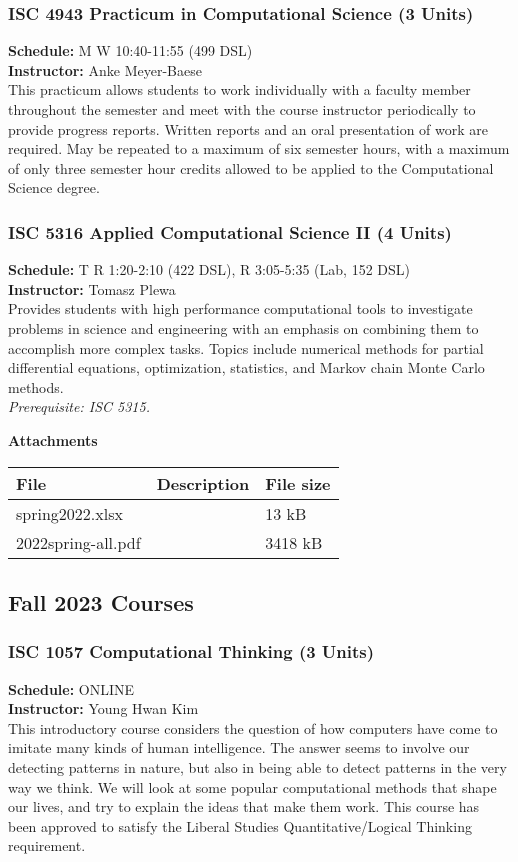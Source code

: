 \documentclass[12pt,a4paper]{article}
\begin{document}
\subsubsection*{ISC 4943 Practicum in Computational Science (3 Units)}
\textbf{Schedule:} M W 10:40-11:55 (499 DSL) \\
\textbf{Instructor:} Anke Meyer-Baese \\
This practicum allows students to work individually with a faculty member throughout the semester and meet with the course instructor periodically to provide progress reports. Written reports and an oral presentation of work are required. May be repeated to a maximum of six semester hours, with a maximum of only three semester hour credits allowed to be applied to the Computational Science degree.

\subsubsection*{ISC 5316 Applied Computational Science II (4 Units)}
\textbf{Schedule:} T R 1:20-2:10 (422 DSL), R 3:05-5:35 (Lab, 152 DSL) \\
\textbf{Instructor:} Tomasz Plewa \\
Provides students with high performance computational tools to investigate problems in science and engineering with an emphasis on combining them to accomplish more complex tasks. Topics include numerical methods for partial differential equations, optimization, statistics, and Markov chain Monte Carlo methods. \\
\textit{Prerequisite: ISC 5315.}

\begin{center}
\textbf{Attachments}
\begin{tabular}{l l l}
\hline
\textbf{File} & \textbf{Description} & \textbf{File size} \\ \hline
spring2022.xlsx & & 13 kB \\
2022spring-all.pdf & & 3418 kB \\ \hline
\end{tabular}
\end{center}
\newpage

\subsection{Fall 2023 Courses}
\subsubsection*{ISC 1057 Computational Thinking (3 Units)}
\textbf{Schedule:} ONLINE \\
\textbf{Instructor:} Young Hwan Kim \\
This introductory course considers the question of how computers have come to imitate many kinds of human intelligence. The answer seems to involve our detecting patterns in nature, but also in being able to detect patterns in the very way we think. We will look at some popular computational methods that shape our lives, and try to explain the ideas that make them work. This course has been approved to satisfy the Liberal Studies Quantitative/Logical Thinking requirement.
\end{document}
